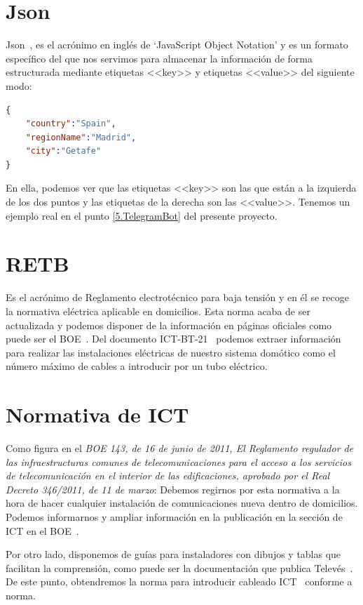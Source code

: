 \section{Json}\label{concepto:JSON}
{Json~\cite{misc:Json}}, es el acrónimo en inglés de ‘JavaScript Object Notation’ y es un formato específico del que nos servimos para almacenar la información de forma estructurada mediante etiquetas <<key>> y etiquetas <<value>> del siguiente modo:

\begin{lstlisting}[language=json,firstnumber=0]
{
    "country":"Spain", 
    "regionName":"Madrid", 
    "city":"Getafe"
}
\end{lstlisting}

En ella, podemos ver que las etiquetas <<key>> son las que están a la izquierda de los dos puntos y las etiquetas de la derecha son las <<value>>. Tenemos un ejemplo real en el punto \ref{5.TelegramBot} del presente proyecto.

\section{RETB}\label{concepto:RETB}
Es el acrónimo de Reglamento electrotécnico para baja tensión y en él se recoge la normativa eléctrica aplicable en domicilios.
Esta norma acaba de ser actualizada y podemos disponer de la información en páginas oficiales como puede ser el BOE~\cite{manual:REBT}.
Del documento ICT-BT-21~\cite{manual:ICT-BT-21} podemos extraer información para realizar las instalaciones eléctricas de nuestro sistema domótico como el número máximo de cables a introducir por un tubo eléctrico.

\section{Normativa de ICT}\label{concepto:Normativa_ICT}
Como figura en el \textit{BOE 143, de 16 de junio de 2011, El Reglamento regulador de las infraestructuras comunes de telecomunicaciones para el acceso a los servicios de telecomunicación en el interior de las edificaciones, aprobado por el Real Decreto 346/2011, de 11 de marzo}:
Debemos regirnos por esta normativa a la hora de hacer cualquier instalación de comunicaciones nueva dentro de domicilios.
Podemos informarnos y ampliar información en la publicación en la sección de ICT en el BOE~\cite{manual:ICT}.

Por otro lado, disponemos de guías para instaladores con dibujos y tablas que facilitan la comprensión, como puede ser la documentación que publica Televés~\cite{manual:ICT-Televes}. De este punto, obtendremos la norma para introducir cableado ICT~\cite{manual:ICT} conforme a norma.

